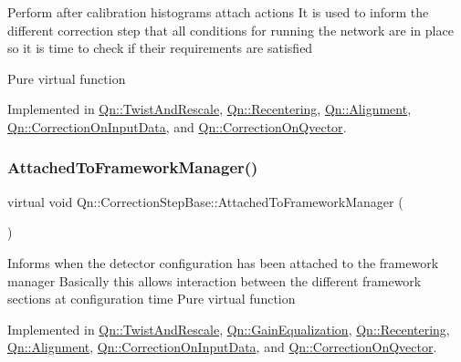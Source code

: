 Perform after calibration histograms attach actions It is used to inform the different correction step that all conditions for running the network are in place so it is time to check if their requirements are satisfied

Pure virtual function 

Implemented in \mbox{\hyperlink{classQn_1_1TwistAndRescale_ab9f2ec874c828bc88d70232ae4ca8e63}{Qn\+::\+Twist\+And\+Rescale}}, \mbox{\hyperlink{classQn_1_1Recentering_afce97632b1a2cc9ecf49a4f4768601dc}{Qn\+::\+Recentering}}, \mbox{\hyperlink{classQn_1_1Alignment_a38007827bb028b2f2e0b4a3fb988d8ed}{Qn\+::\+Alignment}}, \mbox{\hyperlink{classQn_1_1CorrectionOnInputData_ada5498cdbba9a7697a120f47fd64ae46}{Qn\+::\+Correction\+On\+Input\+Data}}, and \mbox{\hyperlink{classQn_1_1CorrectionOnQvector_afa95ec7804ade8097d92002e0ea05e44}{Qn\+::\+Correction\+On\+Qvector}}.

\mbox{\label{classQn_1_1CorrectionStepBase_a0c255ad7095cd2aa89fcf1f1db068949}} 
\subsubsection{\texorpdfstring{Attached\+To\+Framework\+Manager()}{AttachedToFrameworkManager()}}
{\footnotesize\ttfamily virtual void Qn\+::\+Correction\+Step\+Base\+::\+Attached\+To\+Framework\+Manager (\begin{DoxyParamCaption}{ }\end{DoxyParamCaption})\hspace{0.3cm}{\ttfamily [pure virtual]}}

Informs when the detector configuration has been attached to the framework manager Basically this allows interaction between the different framework sections at configuration time Pure virtual function 

Implemented in \mbox{\hyperlink{classQn_1_1TwistAndRescale_a75b3e7001fabda74adcf1441ffab1435}{Qn\+::\+Twist\+And\+Rescale}}, \mbox{\hyperlink{classQn_1_1GainEqualization_a487cc533ff299196a16d0ee4688d1039}{Qn\+::\+Gain\+Equalization}}, \mbox{\hyperlink{classQn_1_1Recentering_aa51bf50f4a003ac79e7d8c669b1efdac}{Qn\+::\+Recentering}}, \mbox{\hyperlink{classQn_1_1Alignment_ad9791cc06c9a7d8c407e1f783c7625f8}{Qn\+::\+Alignment}}, \mbox{\hyperlink{classQn_1_1CorrectionOnInputData_adab1d79e0c216c6c981cd8d7ed271490}{Qn\+::\+Correction\+On\+Input\+Data}}, and \mbox{\hyperlink{classQn_1_1CorrectionOnQvector_ad2d37eb35973c854c7ffa3560a97d510}{Qn\+::\+Correction\+On\+Qvector}}.

